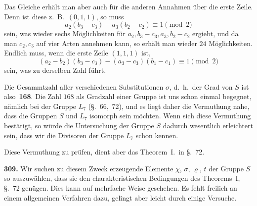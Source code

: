 \documentclass[12pt,a4paper]{article}
\begin{document}
Das Gleiche erh\"alt man aber auch f\"ur die anderen Annahmen \"uber die erste Zeile. Denn ist diese z.~B.\ $(0,1,1)$, so muss
\[
a_2(b_3-c_3) - a_3(b_2-c_2) \equiv 1 \pmod 2
\]
sein, was wieder sechs M\"oglichkeiten f\"ur $a_2,b_3-c_3,a_3,b_2-c_2$ ergiebt, und da man $c_2,c_3$ auf vier Arten annehmen kann, so erh\"alt man wieder $24$ M\"oglichkeiten. Endlich muss, wenn die erste Zeile $(1,1,1)$ ist,
\[
(a_2-b_2)(b_3-c_3) - (a_3-c_3)(b_1-c_1) \equiv 1 \pmod 2
\]
sein, was zu derselben Zahl f\"uhrt.

Die Gesammtzahl aller verschiedenen Substitutionen $\sigma$, d.~h.\ der Grad von $S$ ist also~\textbf{168}. Die Zahl $168$ als Gradzahl einer Gruppe ist uns schon einmal begegnet, n\"amlich bei der Gruppe $L_7$ (\S.~66,~72), und es liegt daher die Vermuthung nahe, dass die Gruppen $S$ und $L_7$ isomorph sein m\"ochten. Wenn sich diese Vermuthung best\"atigt, so w\"urde die Untersuchung der Gruppe $S$ dadurch wesentlich erleichtert sein, dass wir die Divisoren der Gruppe $L_7$ schon kennen.

Diese Vermuthung zu pr\"ufen, dient aber das Theorem~I.\ in \S.~72.

\bigskip
\noindent\textbf{309.} Wir suchen zu diesem Zweck erzeugende Elemente $\chi$, $\sigma$, $\varrho$, $t$ der Gruppe $S$ so auszuw\"ahlen, dass sie den charakteristischen Bedingungen des Theorems~I, \S.~72 gen\"ugen. Dies kann auf mehrfache Weise geschehen. Es fehlt freilich an einem allgemeinen Verfahren dazu, gelingt aber leicht durch einige Versuche.
\end{document}

